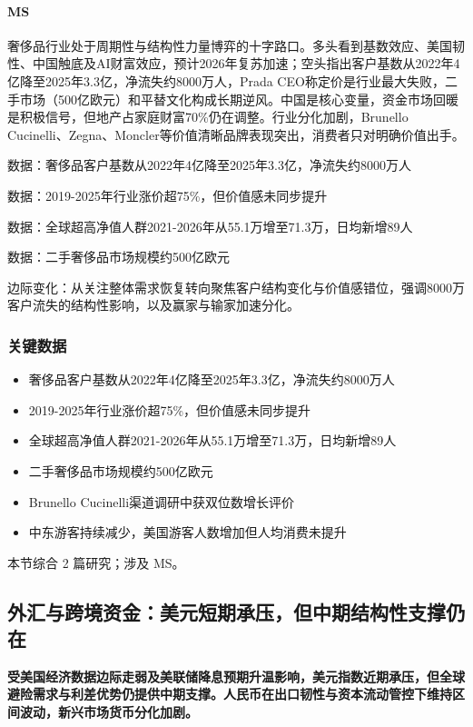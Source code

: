 \documentclass[11pt]{ctexart}
\begin{document}
\paragraph{MS} 奢侈品行业处于周期性与结构性力量博弈的十字路口。多头看到基数效应、美国韧性、中国触底及AI财富效应，预计2026年复苏加速；空头指出客户基数从2022年4亿降至2025年3.3亿，净流失约8000万人，Prada CEO称定价是行业最大失败，二手市场（500亿欧元）和平替文化构成长期逆风。中国是核心变量，资金市场回暖是积极信号，但地产占家庭财富70\%仍在调整。行业分化加剧，Brunello Cucinelli、Zegna、Moncler等价值清晰品牌表现突出，消费者只对明确价值出手。
{\small\color{refgray}数据：奢侈品客户基数从2022年4亿降至2025年3.3亿，净流失约8000万人\par}
{\small\color{refgray}数据：2019-2025年行业涨价超75\%，但价值感未同步提升\par}
{\small\color{refgray}数据：全球超高净值人群2021-2026年从55.1万增至71.3万，日均新增89人\par}
{\small\color{refgray}数据：二手奢侈品市场规模约500亿欧元\par}
{\small\color{refgray}边际变化：从关注整体需求恢复转向聚焦客户结构变化与价值感错位，强调8000万客户流失的结构性影响，以及赢家与输家加速分化。\par}
\subsubsection*{关键数据}
\begin{itemize}
  \item 奢侈品客户基数从2022年4亿降至2025年3.3亿，净流失约8000万人
  \item 2019-2025年行业涨价超75\%，但价值感未同步提升
  \item 全球超高净值人群2021-2026年从55.1万增至71.3万，日均新增89人
  \item 二手奢侈品市场规模约500亿欧元
  \item Brunello Cucinelli渠道调研中获双位数增长评价
  \item 中东游客持续减少，美国游客人数增加但人均消费未提升
\end{itemize}
{\small\color{refgray}本节综合 2 篇研究；涉及 MS。}
\newpage
\subsection{外汇与跨境资金：美元短期承压，但中期结构性支撑仍在}
\textbf{受美国经济数据边际走弱及美联储降息预期升温影响，美元指数近期承压，但全球避险需求与利差优势仍提供中期支撑。人民币在出口韧性与资本流动管控下维持区间波动，新兴市场货币分化加剧。}
\end{document}
